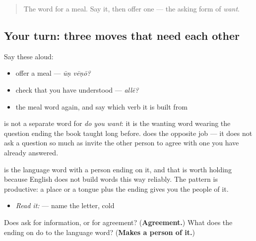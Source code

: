 \label{lesson:ML-R80-what-came-once}



\begin{quote}
The word for a meal. Say it, then offer one — the asking form of \emph{want}.
\end{quote}

\subsection*{Your turn: three moves that need each other}
Say these aloud:

\begin{itemize}
\raggedright
  \item offer a meal — \emph{ūṇ vēṇō?}
  \item check that you have understood — \emph{allē?}
  \item the meal word again, and say which verb it is built from
\end{itemize}

\textbf{} is not a separate word for \emph{do you want}: it is the wanting word wearing the question ending the book taught long before. \textbf{} does the opposite job — it does not ask a question so much as invite the other person to agree with one you have already answered.

\begin{culture}
\textbf{} is the language word with a person ending on it, and that is worth holding because English does not build words this way reliably. The pattern is productive: a place or a tongue plus the ending gives you the people of it.

\begin{itemize}
\raggedright
  \item \emph{Read it:} \textbf{} — name the letter, cold
\end{itemize}
\end{culture}

\begin{tcolorbox}[breakable,colback=teal!4,colframe=teal!35!black,title={Before you move on}]
Does \textbf{} ask for information, or for agreement? (\textbf{Agreement.}) What does the ending on \textbf{} do to the language word? (\textbf{Makes a person of it.})
\end{tcolorbox}
